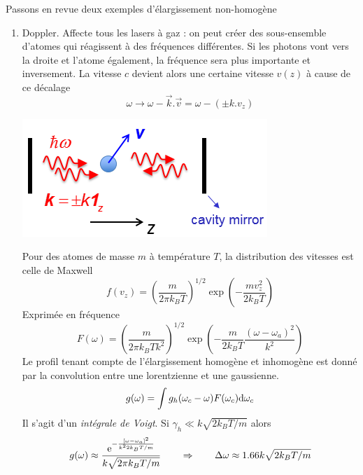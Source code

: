 	 Passons en revue deux exemples d'élargissement non-homogène
	 \begin{enumerate}
	 \item Doppler. Affecte tous les lasers à gaz : on peut créer des sous-ensemble d'atomes qui 
	 réagissent à des fréquences différentes. Si les photons vont vers la droite et l'atome également, 
	 la fréquence sera plus importante et inversement. La vitesse $c$ devient alors une certaine 
	 vitesse $v(z)$ à cause de ce décalage
	 \begin{equation}
	 \omega\to \omega-\vec{k}.\vec{v} = \omega-(\pm k.v_z)
	 \end{equation}
\begin{center}
	 	\includegraphics[scale=0.65]{ch2/image22.png}
\end{center}
	 Pour des atomes de masse $m$ à température $T$, la distribution des vitesses est celle de Maxwell
\begin{equation}
f({v_z}) = {\left( {\frac{m}{{2\pi {k_B}T}}} \right)^{1/2}}\exp ( - \frac{{mv_z^2}}{{2{k_B}T}})
\end{equation}
Exprimée en fréquence
\begin{equation}
F(\omega ) = {\left( {\frac{m}{{2\pi {k_B}T{k^2}}}} \right)^{1/2}}\exp ( - \frac{m}{{2{k_B}T}}\frac{{{{(\omega  - {\omega _a})}^2}}}{{{k^2}}})
\end{equation}
Le profil tenant compte de l'élargissement homogène et inhomogène est donné par la convolution 
entre une lorentzienne et une gaussienne.
\begin{equation}
g(\omega ) = \int {{g_h}({\omega _c} - \omega )} F({\omega _c}){\rm{d}}{\omega _c}
\end{equation}
Il s'agit d'un \textit{intégrale de Voigt}. Si $\gamma_h\ll k\sqrt{2k_BT/m}$ alors
\begin{equation}
g(\omega ) \approx \frac{{{{\mathop{\rm e}\nolimits} ^{ - \frac{{{{[\omega  - {\omega _a}]}^2}}}{{{k^2}2{k_B}T/m}}}}}}{{k\sqrt {2\pi {k_B}T/m} }}\qquad \Rightarrow\qquad \Delta \omega  \approx 1.66k\sqrt {2{k_B}T/m} 
\end{equation}

\end{enumerate}
